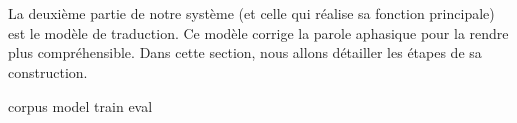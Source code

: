 \section{}

La deuxième partie de notre système (et celle qui réalise sa fonction principale) est le modèle de traduction.
Ce modèle corrige la parole aphasique pour la rendre plus compréhensible.
Dans cette section, nous allons détailler les étapes de sa construction.

{corpus}
{model}
{train}
{eval}
